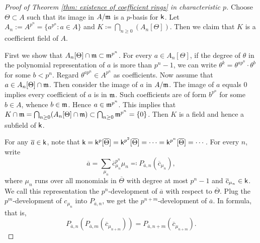         \begin{proof}[Proof of Theorem \ref{thm: existence of coefficient rings} in characteristic \(p\)]
            Choose \(\Theta \subset A\) such that its image in \(A/{\mathfrak{m}}\) is a \(p\)-basis for \({\mathsf{k}}\).
            Let \(A_n := A^{p^n} = \{a^{p^n} \colon a \in A\}\) and \(K \coloneqq \bigcap_{n \geq 0} (A_n[\Theta])\).
            Then we claim that \(K\) is a coefficient field of \(A\).

            First we show that \(A_n[\Theta] \cap {\mathfrak{m}} \subset {\mathfrak{m}}^{p^n}\).
            For every \(a \in A_n[\Theta]\), 
            if the degree of \(\theta\) in the polynomial representation of \(a\) is more than \(p^n-1\), 
            we can write \(\theta^k = \theta^{a p^n} \cdot \theta^{b}\) for some \(b < p^n\).
            Regard \(\theta^{a p^n} \in A^{p^n}\) as coefficients.
            Now assume that \(a \in A_n[\Theta] \cap {\mathfrak{m}}\).
            Then consider the image of \(a\) in \(A/{\mathfrak{m}}\).
            The image of \(a\) equals \(0\) implies every coefficient of \(a\) is in \({\mathfrak{m}}\).
            Such coefficients are of form \(b^{p^n}\) for some \(b \in A\), whence \(b \in {\mathfrak{m}}\).
            Hence \(a \in {\mathfrak{m}}^{p^n}\).
            This implies that \(K \cap {\mathfrak{m}} = \bigcap_{n \geq 0} (A_n[\Theta] \cap {\mathfrak{m}}) \subset \bigcap_{n \geq 0} {\mathfrak{m}}^{p^n} = \{0\}\).
            Then \(K\) is a field and hence a subfield of \({\mathsf{k}}\).

            For any \(\overline{a} \in {\mathsf{k}}\), note that 
            \( {\mathsf{k}} = {\mathsf{k}}^p[\overline{\Theta}] = {\mathsf{k}}^{p^2}[\overline{\Theta}] = \cdots = {\mathsf{k}}^{p^n}[\overline{\Theta}] = \cdots\).
            For every \(n\), write 
            \[ \overline{a} = \sum_{\mu_n} \overline{c}_{\mu_n}^{p^n} \mu_n \eqqcolon P_{\overline{a},n}(\overline{c}_{\mu_n}), \]
            where \(\mu_n\) runs over all monomials in \(\overline{\Theta}\) with degree at most \(p^n-1\) and \(\overline{c}_{\mu_n} \in {\mathsf{k}}\).
            We call this representation the \(p^n\)-development of \(\overline{a}\) with respect to \(\overline{\Theta}\).
            Plug the \(p^m\)-development of \(c_{\mu_n}\) into \(P_{\overline{a},n}\), we get the \(p^{n+m}\)-development of \(\overline{a}\).
            In formula, that is, 
            \[ P_{\overline{a},n}(P_{\overline{a},m}(\overline{c}_{\mu_{n+m}})) = P_{\overline{a},n+m}(\overline{c}_{\mu_{n+m}}). \]


\end{proof}
